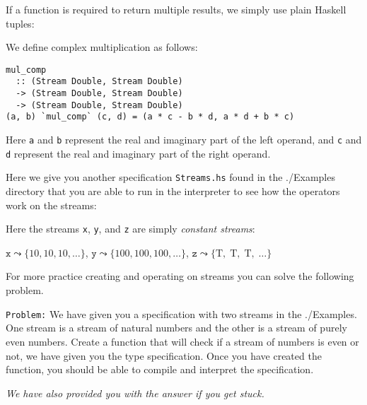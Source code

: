 If a function is required to return multiple results, we simply use plain
Haskell tuples:

\begin{example}
We define complex multiplication as follows:
%
\begin{lstlisting}[language = Copilot, frame = single]
mul_comp
  :: (Stream Double, Stream Double)
  -> (Stream Double, Stream Double)
  -> (Stream Double, Stream Double)
(a, b) `mul_comp` (c, d) = (a * c - b * d, a * d + b * c)
\end{lstlisting}
%
Here {\tt a} and {\tt b} represent the real and imaginary part of the left
operand, and {\tt c} and {\tt d} represent the real and imaginary part
of the right operand.
\end{example}

Here we give you another specification \texttt{Streams.hs} found in the ./Examples directory
that you are able to run in the interpreter to see how the operators work on the streams:

\noindent




\noindent Here the streams {\tt x}, {\tt y}, and {\tt z} are simply
\emph{constant streams}:

\begin{center} $\mathtt{x} \leadsto \{10, 10, 10, \dots \}$, $\mathtt{y}
\leadsto \{100, 100, 100,  \dots \}$, $\mathtt{z} \leadsto \{\mbox{T},\;
\mbox{T},\; \mbox{T},\; \dots \}$ \end{center}

\noindent For more practice creating and operating on streams you can solve the
following problem. 


{\tt Problem:} We have given you a specification with two streams in the
./Examples.
%
One stream is a stream of natural numbers and the other is a stream of purely
even numbers.
%
Create a function that will check if a stream of numbers is even or not, we
have given you the type specification.
%
Once you have created the function, you should be able to compile and interpret the
specification.
%

\emph{We have also provided you with the answer if you get stuck.}
%



